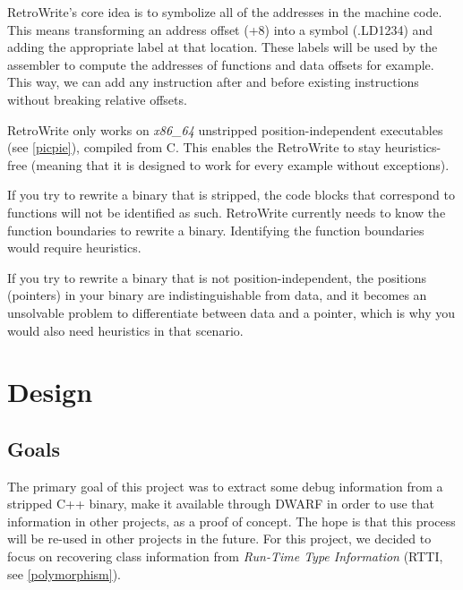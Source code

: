 \documentclass[a4paper,11pt,oneside]{report}
\begin{document}
RetroWrite's core idea is to symbolize all of the addresses in the machine
code. This means transforming an address offset (+8) into a symbol
(.LD1234) and adding the appropriate label at that location.
These labels will be used by the assembler to compute the addresses of
functions and data offsets for example.
This way, we can add any instruction after and before existing instructions
without breaking relative offsets.

RetroWrite only works on \emph{x86\_64} unstripped position-independent
executables (see \autoref{picpie}), compiled from C.
This enables the RetroWrite to stay heuristics-free (meaning that it is
designed to work for every example without exceptions).

If you try to rewrite a binary that is stripped, the code blocks that
correspond to functions will not be identified as such.
RetroWrite currently needs to know the function boundaries to rewrite a binary.
Identifying the function boundaries would require heuristics.

If you try to rewrite a binary that is not position-independent, the
positions (pointers) in your binary are indistinguishable from data, and it
becomes an unsolvable problem to differentiate between data and a pointer,
which is why you would also need heuristics in that scenario.


\chapter{Design}




\section{Goals}

The primary goal of this project was to extract some debug information from a
stripped C++ binary, make it available through DWARF in order to use that
information in other projects, as a proof of concept.
The hope is that this process will be re-used in other projects in the future.
For this project, we decided to focus on recovering class information from
\emph{Run-Time Type Information} (RTTI, see \autoref{polymorphism}).
\end{document}
